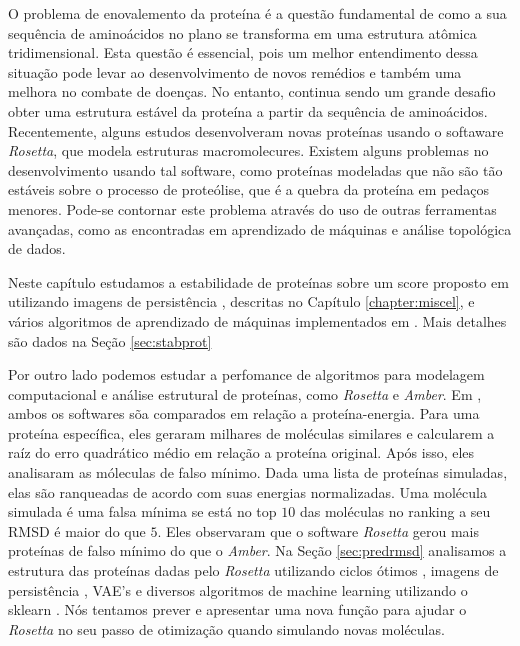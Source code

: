 O problema de enovalemento da proteína é a questão fundamental de como a sua sequência de aminoácidos
no plano se transforma em uma estrutura atômica tridimensional. Esta questão é essencial, pois
um melhor entendimento dessa situação pode levar ao desenvolvimento de novos remédios e também
uma melhora no combate de doenças. No entanto, continua sendo um grande desafio obter
uma estrutura estável da proteína a partir da sequência de aminoácidos.
Recentemente, alguns estudos \cite{Rocklin2017} desenvolveram novas proteínas usando o softaware
\textit{Rosetta}, que modela estruturas macromolecures. Existem alguns problemas no
desenvolvimento usando tal software, como proteínas modeladas que não são tão
estáveis sobre o processo de proteólise, que é a quebra da proteína em pedaços
menores. Pode-se contornar este problema através do uso de outras ferramentas avançadas, como
as encontradas em aprendizado de máquinas e análise topológica de dados.

Neste capítulo estudamos a estabilidade de proteínas sobre um score proposto
em \cite{Rocklin2017} utilizando imagens de persistência \cite{Adams2017}, descritas
no Capítulo \ref{chapter:miscel}, e vários algoritmos de aprendizado de máquinas
implementados em \cite{scikit-learn}. Mais detalhes são dados na Seção \ref{sec:stabprot}

Por outro lado podemos estudar a perfomance de algoritmos para modelagem computacional e
análise estrutural de proteínas, como \textit{Rosetta} e \textit{Amber}.
Em \cite{Rubenstein2018}, ambos os softwares sõa comparados em relação a proteína-energia.
Para uma proteína específica, eles geraram milhares de moléculas similares e calcularem
a raíz do erro quadrático médio em relação a proteína original.
Após isso, eles analisaram as móleculas de falso mínimo. Dada uma lista de proteínas
simuladas, elas são ranqueadas de acordo com suas energias normalizadas. Uma molécula
simulada é uma falsa mínima se está no top $10$ das moléculas no ranking a seu
RMSD é maior do que $5$. Eles observaram que o software \textit{Rosetta} gerou mais
proteínas de falso mínimo do que o \textit{Amber}. Na Seção \ref{sec:predrmsd}
analisamos a estrutura das proteínas dadas pelo \textit{Rosetta} utilizando ciclos ótimos
\cite{Escolar2015}, imagens de persistência \cite{Adams2017}, VAE's \cite{kingma2013} e
diversos algoritmos de machine learning utilizando o sklearn \cite{scikit-learn}. Nós
tentamos prever e apresentar uma nova função para ajudar o \textit{Rosetta} no seu
passo de otimização quando simulando novas moléculas.


